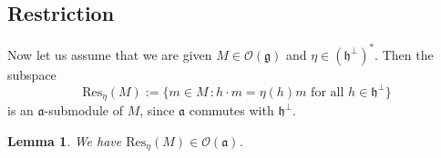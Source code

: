 \documentclass[a4paper]{amsart}
\newtheorem{lemma}[theorem]{Lemma}
\begin{document}
\subsection{Restriction}\label{s2.3}

Now let us assume that we are given $M\in\mathcal{O}(\mathfrak{g})$
and $\eta\in(\mathfrak{h}^\perp)^*$. Then the subspace
\begin{displaymath}
\mathrm{Res}_\eta(M):=\{m\in M\,: h\cdot m=\eta(h)m\text{ for all }
h\in \mathfrak{h}^\perp\} 
\end{displaymath}
is an $\mathfrak{a}$-submodule of $M$, since $\mathfrak{a}$
commutes with $\mathfrak{h}^\perp$.

\begin{lemma}\label{lem-s2.3-1}
We have $\mathrm{Res}_\eta(M)\in \mathcal{O}(\mathfrak{a})$. 
\end{lemma}
\end{document}
